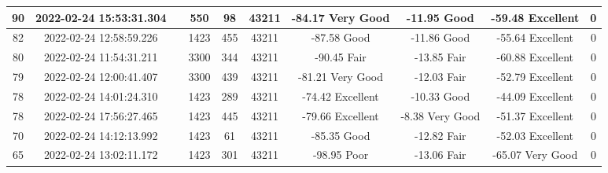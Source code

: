 \begin{longtable*}{|c|c|c|c|c|c|c|c|c|c|}
90&2022-02-24 15:53:31.304&&550&98&43211& -84.17    Very Good   & -11.95    Good        & -59.48    Excellent   & 0\\\hline
{}82&2022-02-24 12:58:59.226&&1423&455&43211& -87.58    Good        & -11.86    Good        & -55.64    Excellent   & 0\\\hline
{}80&2022-02-24 11:54:31.211&&3300&344&43211& -90.45    Fair        & -13.85    Fair        & -60.88    Excellent   & 0\\\hline
{}79&2022-02-24 12:00:41.407&&3300&439&43211& -81.21    Very Good   & -12.03    Fair        & -52.79    Excellent   & 0\\\hline
{}78&2022-02-24 14:01:24.310&&1423&289&43211& -74.42    Excellent   & -10.33    Good        & -44.09    Excellent   & 0\\\hline
{}78&2022-02-24 17:56:27.465&&1423&445&43211& -79.66    Excellent   & -8.38     Very Good   & -51.37    Excellent   & 0\\\hline
{}70&2022-02-24 14:12:13.992&&1423&61&43211& -85.35    Good        & -12.82    Fair        & -52.03    Excellent   & 0\\\hline
{}65&2022-02-24 13:02:11.172&&1423&301&43211& -98.95    Poor        & -13.06    Fair        & -65.07    Very Good   & 0\\\hline

\end{longtable*}
